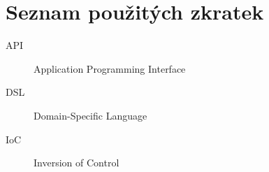 \chapter{Seznam použitých zkratek}
\begin{description}
	\item[API] Application Programming Interface
	\item[DSL] Domain-Specific Language
	\item[IoC] Inversion of Control
\end{description}